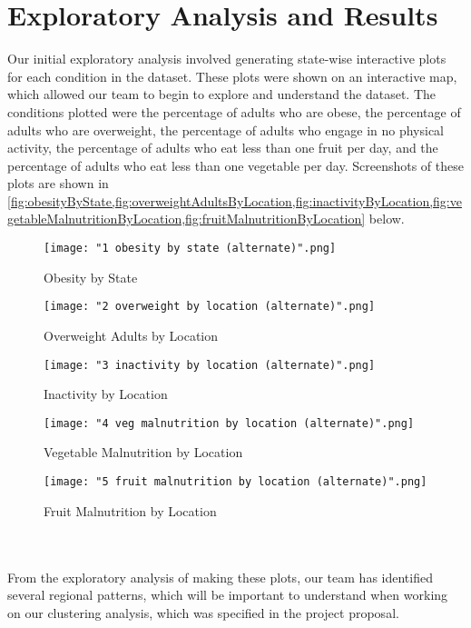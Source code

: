\documentclass{article}
\begin{document}
\section{Exploratory Analysis and Results}
\label{results}
Our initial exploratory analysis involved generating state-wise interactive plots for each condition in the dataset. These plots were shown on an interactive map, which allowed our team to begin to explore and understand the dataset. The conditions plotted were the percentage of adults who are obese, the percentage of adults who are overweight, the percentage of adults who engage in no physical activity, the percentage of adults who eat less than one fruit per day, and the percentage of adults who eat less than one vegetable per day. Screenshots of these plots are shown in \cref{fig:obesityByState,fig:overweightAdultsByLocation,fig:inactivityByLocation,fig:vegetableMalnutritionByLocation,fig:fruitMalnutritionByLocation} below. 
\begin{figure}[h]
\centering
\caption{Obesity by State}
\texttt{[image: "1 obesity by state (alternate)".png]}
\label{fig:obesityByState}
\end{figure}
\begin{figure}[h]
\centering
\caption{Overweight Adults by Location}
\texttt{[image: "2 overweight by location (alternate)".png]}
\label{fig:overweightAdultsByLocation}
\end{figure}
\begin{figure}[h]
\centering
\caption{Inactivity by Location}
\texttt{[image: "3 inactivity by location (alternate)".png]}
\label{fig:inactivityByLocation}
\end{figure}
\begin{figure}[h]
\centering
\caption{Vegetable Malnutrition by Location}
\texttt{[image: "4 veg malnutrition by location (alternate)".png]}
\label{fig:vegetableMalnutritionByLocation}
\end{figure}
\begin{figure}[h]
\centering
\caption{Fruit Malnutrition by Location}
\texttt{[image: "5 fruit malnutrition by location (alternate)".png]}
\label{fig:fruitMalnutritionByLocation}
\end{figure}
\\\\
From the exploratory analysis of making these plots, our team has identified several regional patterns, which will be important to understand when working on our clustering analysis, which was specified in the project proposal.
\end{document}
